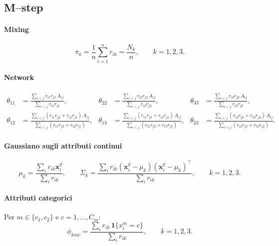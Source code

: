 \documentclass[11pt,a4paper]{article}
\begin{document}
\subsection*{M--step}

\paragraph{Mixing}
\[
\pi_k = \frac{1}{n}\sum_{i=1}^n r_{ik}=\frac{N_k}{n}, \qquad k=1,2,3.
\]

\paragraph{Network}
\begin{align*}
\theta_{11} &= \frac{\sum_{i<j} r_{i1}r_{j1}\,A_{ij}}{\sum_{i<j} r_{i1}r_{j1}}, &
\theta_{22} &= \frac{\sum_{i<j} r_{i2}r_{j2}\,A_{ij}}{\sum_{i<j} r_{i2}r_{j2}}, &
\theta_{33} &= \frac{\sum_{i<j} r_{i3}r_{j3}\,A_{ij}}{\sum_{i<j} r_{i3}r_{j3}}, \\
\theta_{12} &= \frac{\sum_{i<j}(r_{i1}r_{j2}+r_{i2}r_{j1})\,A_{ij}}
                   {\sum_{i<j}(r_{i1}r_{j2}+r_{i2}r_{j1})}, &
\theta_{13} &= \frac{\sum_{i<j}(r_{i1}r_{j3}+r_{i3}r_{j1})\,A_{ij}}
                   {\sum_{i<j}(r_{i1}r_{j3}+r_{i3}r_{j1})}, &
\theta_{23} &= \frac{\sum_{i<j}(r_{i2}r_{j3}+r_{i3}r_{j2})\,A_{ij}}
                   {\sum_{i<j}(r_{i2}r_{j3}+r_{i3}r_{j2})}.
\end{align*}

\paragraph{Gaussiano sugli attributi continui}
\[
\mu_k = \frac{\sum_i r_{ik}\mathbf{x}_i^{g}}{\sum_i r_{ik}}, 
\qquad
\Sigma_k = \frac{\sum_i r_{ik}(\mathbf{x}_i^{g}-\mu_k)(\mathbf{x}_i^{g}-\mu_k)^\top}{\sum_i r_{ik}},
\qquad k=1,2,3.
\]

\paragraph{Attributi categorici}
Per $m \in \{c_1,c_2\}$ e $c=1,\dots,C_m$:
\[
\phi_{kmc} = 
\frac{\sum_i r_{ik}\,\mathbf{1}\{x_i^{m}=c\}}{\sum_i r_{ik}},
\qquad k=1,2,3.
\]

\end{document}
